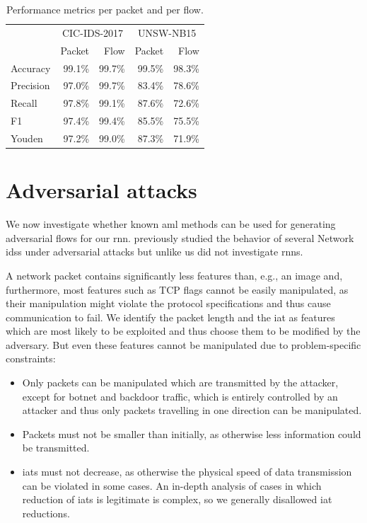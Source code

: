 \documentclass[conference]{IEEEtran}
\begin{document}
\begin{table}
\caption{Performance metrics per packet and per flow.} \label{tab:performance_results}
\centering
\begin{tabular}{l r r r r} \toprule
& \multicolumn{2}{c}{CIC-IDS-2017} & \multicolumn{2}{c}{UNSW-NB15} \\
	&	Packet	&	Flow	&	Packet	&	Flow	\\	\midrule
Accuracy	&	99.1\%	&	99.7\%	&	99.5\%	&	98.3\%	\\
Precision	&	97.0\%	&	99.7\%	&	83.4\%	&	78.6\%	\\
Recall	&	97.8\%	&	99.1\%	&	87.6\%	&	72.6\%	\\
F1	&	97.4\%	&	99.4\%	&	85.5\%	&	75.5\%	\\
Youden	&	97.2\%	&	99.0\%	&	87.3\%	&	71.9\%	\\
\bottomrule
\end{tabular}
\end{table}

\section{Adversarial attacks}
\label{sec:adv}
We now investigate whether known \gls{aml} methods can be used for generating adversarial flows for our \gls{rnn}. \cite{hashemi_towards_2019} previously studied the behavior of several Network \glspl{ids} under adversarial attacks but unlike us did not investigate \glspl{rnn}.

A network packet contains significantly less features than, e.g., an image and, furthermore, most features such as TCP flags cannot be easily manipulated, as their manipulation might violate the protocol specifications and thus cause communication to fail. We identify the packet length and the \gls{iat} as features which are most likely to be exploited and thus choose them to be modified by the adversary. But even these features cannot be manipulated due to problem-specific constraints:
\begin{itemize}[topsep=0pt,wide,labelwidth=!,labelindent=0pt]
\item Only packets can be manipulated which are transmitted by the attacker, except for botnet and backdoor traffic, which is entirely controlled by an attacker and thus only packets travelling in one direction can be manipulated.
\item Packets must not be smaller than initially, as otherwise less information could be transmitted.
\item \glspl{iat} must not decrease, as otherwise the physical speed of data transmission can be violated in some cases. An in-depth analysis of cases in which reduction of \glspl{iat} is legitimate is complex, so we generally disallowed \gls{iat} reductions.
\end{itemize}
\end{document}
